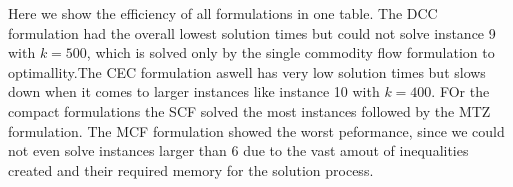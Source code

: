 \documentclass[11pt]{article}
\begin{document}
Here we show the efficiency of all formulations in one table. The DCC formulation had the overall lowest solution times but could not solve instance 9 with $k=500$, which is solved only by the single commodity flow formulation to optimallity.The CEC formulation aswell has very low solution times but slows down when it comes to larger instances like instance 10 with $k=400$. FOr the compact formulations the SCF solved the most instances followed by the MTZ formulation. The MCF formulation showed the worst peformance, since we could not even solve instances larger than 6 due to the vast amout of inequalities created and their required memory for the solution process.






%
\newpage
 

\end{document}
